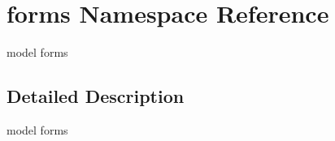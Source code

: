 \hypertarget{namespaceforms}{}\section{forms Namespace Reference}
\label{namespaceforms}


model forms  




\subsection{Detailed Description}
model forms 